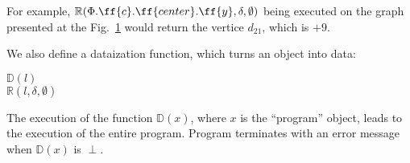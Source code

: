 For example, $\mathbb{R}(\Phi.\ff{c}.\ff{center}.\ff{y},
\delta, \emptyset)$ being executed on the graph presented at the
Fig.~\ref{fig:is} would return the vertice $d_{21}$, which is $+9$.

We also define a dataization function, which turns an object into data:

\begin{algo}
 $\mathbb{D}(l)$ \\
  \tab {} $\mathbb{R}(l, \delta, \emptyset)$ \\
\end{algo}

The execution of the function $\mathbb{D}(x)$, where $x$ is the
``program'' object, leads to the execution of the entire program.
Program terminates with an error message when $\mathbb{D}(x)$ is $\perp$.

\begin{figure*}

\label{fig:is}
\end{figure*}

